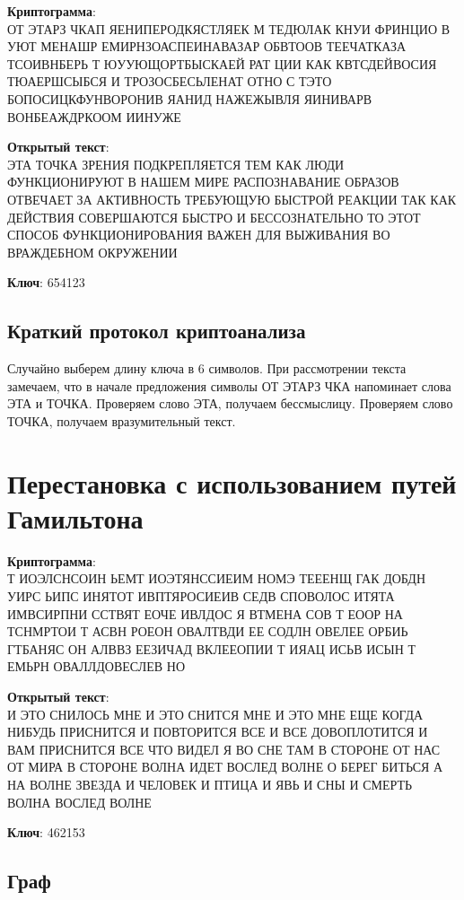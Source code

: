\documentclass[12pt, a4paper] {ncc}
\begin{document}
\textbf{Криптограмма}: \\
ОТ ЭТАРЗ ЧКАП ЯЕНИПЕРОДКЯСТЛЯЕК М ТЕДЮЛАК КНУИ ФРИНЦИО В УЮТ МЕНАШР ЕМИРНЗОАСПЕИНАВАЗАР ОБВТООВ  ТЕЕЧАТКАЗА ТСОИВНБЕРЬ Т ЮУУЮЩОРТБЫСКАЕЙ РАТ ЦИИ КАК КВТСДЕЙВОСИЯ ТЮАЕРШСЫБСЯ  И ТРОЗОСБЕСЬЛЕНАТ ОТНО С ТЭТО БОПОСИЦКФУНВОРОНИВ ЯАНИД НАЖЕЖЫВЛЯ ЯИНИВАРВ  ВОНБЕАЖДРКООМ ИИНУЖЕ

\textbf{Открытый текст}: \\
ЭТА ТОЧКА ЗРЕНИЯ ПОДКРЕПЛЯЕТСЯ ТЕМ КАК ЛЮДИ ФУНКЦИОНИРУЮТ В НАШЕМ МИРЕ РАСПОЗНАВАНИЕ ОБРАЗОВ ОТВЕЧАЕТ ЗА АКТИВНОСТЬ ТРЕБУЮЩУЮ БЫСТРОЙ РЕАКЦИИ ТАК КАК ДЕЙСТВИЯ СОВЕРШАЮТСЯ БЫСТРО И БЕССОЗНАТЕЛЬНО ТО ЭТОТ СПОСОБ ФУНКЦИОНИРОВАНИЯ ВАЖЕН ДЛЯ ВЫЖИВАНИЯ ВО ВРАЖДЕБНОМ ОКРУЖЕНИИ

\textbf{Ключ}:
654123

\subsection{Краткий протокол криптоанализа}

Случайно выберем длину ключа в 6 символов. При рассмотрении текста замечаем, что в начале предложения символы ОТ ЭТАРЗ ЧКА напоминает
слова ЭТА и ТОЧКА. Проверяем слово ЭТА, получаем бессмыслицу. Проверяем слово ТОЧКА, получаем вразумительный текст. 

\section{Перестановка с использованием путей Гамильтона}

\textbf{Криптограмма}: \\
Т  ИОЭЛСНСОИН  ЬЕМТ  ИОЭТЯНССИЕИМ  НОМЭ  ТЕЕЕНЩ ГАК ДОБДН УИРС ЬИПС ИНЯТОТ ИВПТЯРОСИЕИВ  СЕДВ  СПОВОЛОС ИТЯТА  ИМВСИРПНИ ССТВЯТ  ЕОЧЕ ИВЛДОС Я ВТМЕНА СОВ Т ЕООР НА  ТСНМРТОИ  Т АСВН РОЕОН ОВАЛТВДИ ЕЕ СОДЛН ОВЕЛЕЕ ОРБИЬ ГТБАНЯС  ОН АЛВВЗ ЕЕЗИЧАД  ВКЛЕЕОПИИ Т ИЯАЦ  ИСЬВ  ИСЫН  Т ЕМЬРН ОВАЛЛДОВЕСЛЕВ НО

\textbf{Открытый текст}: \\
И ЭТО СНИЛОСЬ МНЕ И ЭТО СНИТСЯ МНЕ И ЭТО МНЕ ЕЩЕ КОГДА НИБУДЬ ПРИСНИТСЯ И ПОВТОРИТСЯ ВСЕ И ВСЕ ДОВОПЛОТИТСЯ И ВАМ ПРИСНИТСЯ ВСЕ ЧТО ВИДЕЛ Я ВО СНЕ ТАМ В СТОРОНЕ ОТ НАС ОТ МИРА В СТОРОНЕ ВОЛНА ИДЕТ ВОСЛЕД ВОЛНЕ О БЕРЕГ БИТЬСЯ А НА ВОЛНЕ ЗВЕЗДА И ЧЕЛОВЕК И ПТИЦА И ЯВЬ И СНЫ И СМЕРТЬ ВОЛНА ВОСЛЕД ВОЛНЕ

\textbf{Ключ}:  462153

\subsection{Граф}
\end{document}
